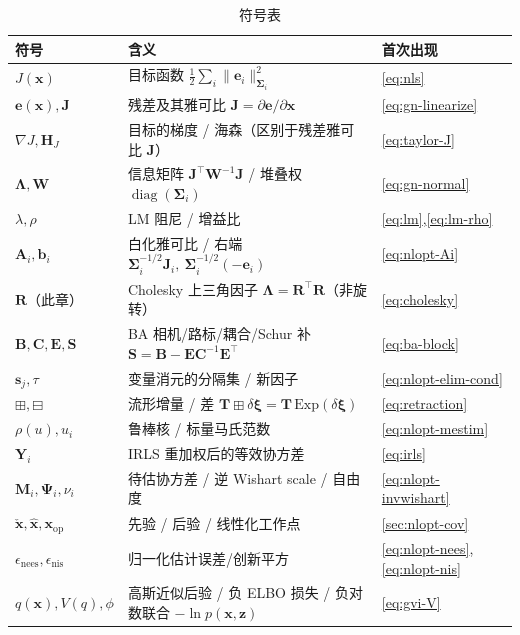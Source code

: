 \begin{table}[H]\centering\small
\caption{符号表}
\begin{tabular}{lll}
\toprule
符号 & 含义 & 首次出现 \\
\midrule
$J(\mathbf{x})$ & 目标函数 $\tfrac12\sum_i\|\mathbf{e}_i\|_{\boldsymbol{\Sigma}_i}^2$ & \cref{eq:nls} \\
$\mathbf{e}(\mathbf{x}),\mathbf{J}$ & 残差及其雅可比 $\mathbf{J}=\partial\mathbf{e}/\partial\mathbf{x}$ & \cref{eq:gn-linearize} \\
$\nabla J,\mathbf{H}_J$ & 目标的梯度 / 海森（区别于残差雅可比 $\mathbf{J}$） & \cref{eq:taylor-J} \\
$\boldsymbol{\Lambda},\mathbf{W}$ & 信息矩阵 $\mathbf{J}^\top\mathbf{W}^{-1}\mathbf{J}$ / 堆叠权 $\operatorname{diag}(\boldsymbol{\Sigma}_i)$ & \cref{eq:gn-normal} \\
$\lambda,\rho$ & LM 阻尼 / 增益比 & \cref{eq:lm},\cref{eq:lm-rho} \\
$\mathbf{A}_i,\mathbf{b}_i$ & 白化雅可比 / 右端 $\boldsymbol{\Sigma}_i^{-1/2}\mathbf{J}_i,\ \boldsymbol{\Sigma}_i^{-1/2}(-\mathbf{e}_i)$ & \cref{eq:nlopt-Ai} \\
$\mathbf{R}$（此章）& Cholesky 上三角因子 $\boldsymbol{\Lambda}=\mathbf{R}^\top\mathbf{R}$（非旋转） & \cref{eq:cholesky} \\
$\mathbf{B},\mathbf{C},\mathbf{E},\mathbf{S}$ & BA 相机/路标/耦合/Schur 补 $\mathbf{S}=\mathbf{B}-\mathbf{E}\mathbf{C}^{-1}\mathbf{E}^\top$ & \cref{eq:ba-block} \\
$\mathbf{s}_j,\tau$ & 变量消元的分隔集 / 新因子 & \cref{eq:nlopt-elim-cond} \\
$\boxplus,\boxminus$ & 流形增量 / 差 $\mathbf{T}\boxplus\delta\boldsymbol{\xi}=\mathbf{T}\,\mathrm{Exp}(\delta\boldsymbol{\xi})$ & \cref{eq:retraction} \\
$\rho(u),u_i$ & 鲁棒核 / 标量马氏范数 & \cref{eq:nlopt-mestim} \\
$\mathbf{Y}_i$ & IRLS 重加权后的等效协方差 & \cref{eq:irls} \\
$\mathbf{M}_i,\boldsymbol{\Psi}_i,\nu_i$ & 待估协方差 / 逆 Wishart scale / 自由度 & \cref{eq:nlopt-invwishart} \\
$\check{\mathbf{x}},\hat{\mathbf{x}},\mathbf{x}_{\mathrm{op}}$ & 先验 / 后验 / 线性化工作点 & \cref{sec:nlopt-cov} \\
$\epsilon_{\text{nees}},\epsilon_{\text{nis}}$ & 归一化估计误差/创新平方 & \cref{eq:nlopt-nees},\cref{eq:nlopt-nis} \\
$q(\mathbf{x}),V(q),\phi$ & 高斯近似后验 / 负 ELBO 损失 / 负对数联合 $-\ln p(\mathbf{x},\mathbf{z})$ & \cref{eq:gvi-V} \\

\end{tabular}
\end{table}
